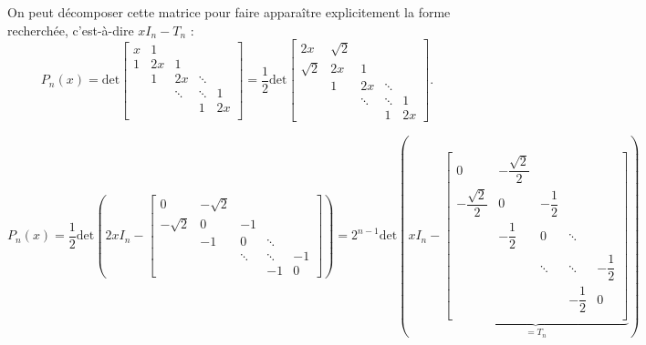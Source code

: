 On peut décomposer cette matrice pour faire apparaître explicitement la forme recherchée, c'est-à-dire $xI_n - T_n$ :
$$
P_n(x) = \text{det}
\left[
  \begin{array}{ccccc}
    x & 1 & & &  \\
    1 & 2x & 1 & & \\
      & 1 & 2x & \ddots & \\
      & & \ddots & \ddots & 1  \\
      & & & 1 & 2x   \\
  \end{array}
\right] = \frac{1}{2 }\text{det}
\left[
  \begin{array}{cccccc}
    2x & \sqrt{2} & & & \\
    \sqrt{2} & 2x & 1 & & \\
             & 1 & 2x & \ddots & \\
             & & \ddots & \ddots & 1 \\
             & & & 1 & 2x
  \end{array}
\right].
$$

$$
P_n(x) = \frac{1}{2} \text{det} \left( 2x I_n - \left[
    \begin{array}{cccccc}
      0 & -\sqrt{2} & & &  \\
      -\sqrt{2} & 0 & -1 & & \\
                & -1 & 0 & \ddots & \\
                & & \ddots & \ddots  &  -1\\
                & & & -1 & 0
    \end{array}
\right] \right) = 2^{n-1} \text{det} \left( x I_n - \underbrace{\left[
      \begin{array}{ccccc}
        0 & - \dfrac{\sqrt{2}}{2} & & &  \\
        - \dfrac{\sqrt{2}}{2} & 0 & -\dfrac{1}{2} & & \\
                              & -\dfrac{1}{2} & 0 & \ddots &  \\
                              & & \ddots & \ddots & -\dfrac{1}{2} \\
                              & & & -\dfrac{1}{2} & 0 \\
      \end{array}
\right]}_{=T_n}  \right)
$$


